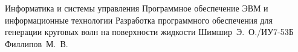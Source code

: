\documentclass{bmstu}
\begin{document}
\renewcommand{\thelstlisting}{\arabic{lstlisting}}

\makecourseworktitle
    {Информатика и системы управления}
    {Программное обеспечение ЭВМ и информационные технологии}
    {Разработка программного обеспечения для генерации круговых волн на поверхности жидкости}
    {Шимшир~Э.~О./ИУ7-53Б}
    {Филлипов~М.~В.}
    {}

\maketableofcontents

 
 
 
 





\makebibliography

\end{document}
